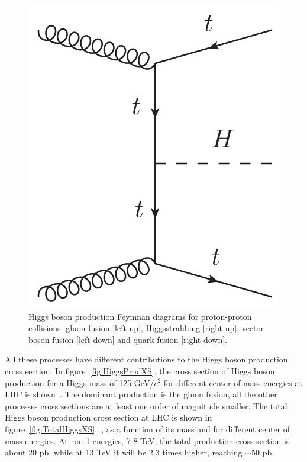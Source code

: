 \begin{figure}[!Hhtbp]
\begin{center}
    \includegraphics[scale=0.45]{figs/QuarkF_H.png}
    \caption{Higgs boson production Feynman diagrams for proton-proton collisions: gluon fusion [left-up], Higgsstrahlung [right-up], vector boson fusion [left-down] and quark fusion [right-down].}
    \label{fig:HiggsProd}
  \end{center}
\end{figure}

All these processes have different contributions to the Higgs boson production cross section. In figure~\ref{fig:HiggsProdXS}, the cross section of Higgs boson production for a Higgs mass of 125 GeV/$c^{2}$ for different center of mass energies at LHC is shown~\cite{HIGGSXSWG}. The dominant production is the gluon fusion, all the other processes cross sections are at least one order of magnitude smaller. The total Higgs boson production cross section at LHC is shown in figure~\ref{fig:TotalHiggsXS},~\cite{Dittmaier:2011ti, Dittmaier:2012vm, Heinemeyer:2013tqa, HIGGSXSWG}, as a function of its mass and for different center of mass energies. At run 1 energies, 7-8 TeV, the total production cross section is about 20 pb, while at 13 TeV it will be 2.3 times higher, reaching $\sim$50 pb. 

